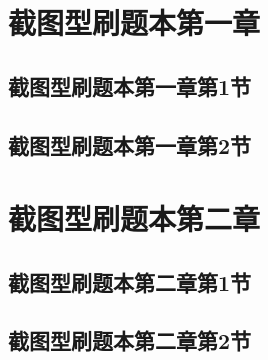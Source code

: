 \documentclass[padl]{ExBook}
\begin{document}


\maketitle 

 



\setcounter{page}{1}
\tableofcontents 
    
\clearpage 

\section{截图型刷题本第一章}
\subsection{截图型刷题本第一章第1节}

\begin{qitems}
\end{qitems} 

\subsection{截图型刷题本第一章第2节}

\begin{qitems}
\end{qitems}
 
\section{截图型刷题本第二章}
\subsection{截图型刷题本第二章第1节}

\begin{qitems}
\end{qitems}

\subsection{截图型刷题本第二章第2节}

\begin{qitems}
\end{qitems}
\end{document}
